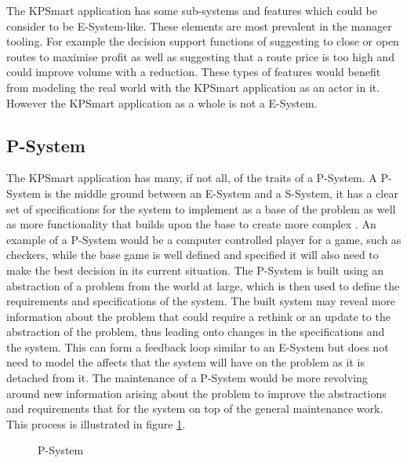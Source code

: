 \documentclass{style/CRPITStyle}
\renewcommand{\cite}{\citep}
\begin{document}
The KPSmart application has some sub-systems and features which could
be consider to be E-System-like. These elements are most prevalent in
the manager tooling. For example the decision support functions of suggesting
to close or open routes to maximise profit as well as suggesting that a route
price is too high and could improve volume with a reduction. These types of
features would benefit from modeling the real world with the KPSmart application
as an actor in it. However the KPSmart application as a whole is not a E-System.

\vspace{.1in}

\subsection{P-System}

The KPSmart application has many, if not all, of the traits of a
P-System. A P-System is the middle ground between an E-System and a
S-System, it has a clear set of specifications for the system to
implement as a base of the problem as well as more functionality that
builds upon the base to create more complex \cite{lehman:1980}. An
example of a P-System would be a computer controlled player for a game,
such as checkers, while the base game is well defined and specified it
will also need to make the best decision in its current situation.
The P-System is built using an abstraction of a problem from the world
at large, which is then used to define the requirements and specifications
of the system. The built system may reveal more information about the problem
that could require a rethink or an update to the abstraction of the problem,
thus leading onto changes in the specifications and the system. This can form
a feedback loop similar to an E-System but does not need to model the affects
that the system will have on the problem as it is detached from it.
The maintenance of a P-System would be more revolving around new information
arising about the problem to improve the abstractions and requirements that for
the system on top of the general maintenance work.
This process is illustrated in figure \ref{p-system}.

\vspace{.1in}

\begin{figure}[htb]
\caption{\protect\label{p-system}  P-System }
\end{figure}
\end{document}
